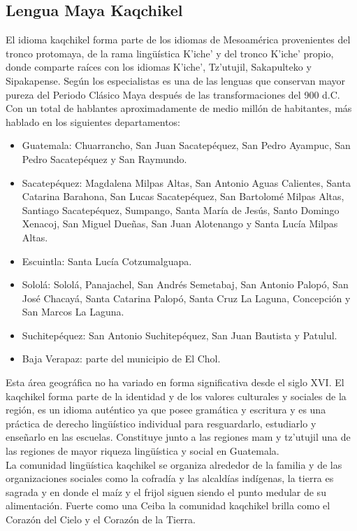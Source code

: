 \documentclass[a4paper,openright,11pt]{article}
\begin{document}
\subsection{Lengua Maya Kaqchikel}
El idioma kaqchikel forma parte de los idiomas de Mesoamérica provenientes del tronco protomaya, de la rama lingüística K’iche’ y del tronco K’iche’ propio, donde comparte raíces con los idiomas K’iche’, Tz’utujil, Sakapulteko y Sipakapense. Según los especialistas es una de las lenguas que conservan mayor pureza del Periodo Clásico Maya después de las transformaciones del 900 d.C. Con un total de hablantes aproximadamente de medio millón de habitantes, más hablado en los siguientes departamentos:
\begin{itemize}
	\item Guatemala: Chuarrancho, San Juan Sacatepéquez, San Pedro Ayampuc, San Pedro Sacatepéquez y San Raymundo.
	\item Sacatepéquez: Magdalena Milpas Altas, San Antonio Aguas Calientes, Santa Catarina Barahona, San Lucas Sacatepéquez, San Bartolomé Milpas Altas, Santiago Sacatepéquez, Sumpango, Santa María de Jesús, Santo Domingo Xenacoj, San Miguel Dueñas, San Juan Alotenango y Santa Lucía Milpas Altas.
	\item Escuintla: Santa Lucía Cotzumalguapa.
	\item Sololá: Sololá, Panajachel, San Andrés Semetabaj, San Antonio Palopó, San José Chacayá, Santa Catarina Palopó, Santa Cruz La Laguna, Concepción y San Marcos La Laguna.
	\item Suchitepéquez: San Antonio Suchitepéquez, San Juan Bautista y Patulul.
	\item Baja Verapaz: parte del municipio de El Chol.
\end{itemize}
Esta área geográfica no ha variado en forma significativa desde el siglo XVI. El kaqchikel  forma parte de la identidad y de los valores culturales y sociales de la región, es un idioma auténtico ya que posee gramática y escritura y es una práctica de derecho lingüístico individual para resguardarlo, estudiarlo y enseñarlo en las escuelas. Constituye junto a las regiones mam y tz’utujil una de las regiones de mayor riqueza lingüística y social en Guatemala. \\

La comunidad lingüística kaqchikel se organiza alrededor de la familia y de las organizaciones sociales como la cofradía y las alcaldías indígenas, la tierra es sagrada y en donde el maíz y el frijol siguen siendo el punto medular de su alimentación. Fuerte como una Ceiba la comunidad kaqchikel brilla como el Corazón del Cielo y el Corazón de la Tierra.\\ 
\end{document}

